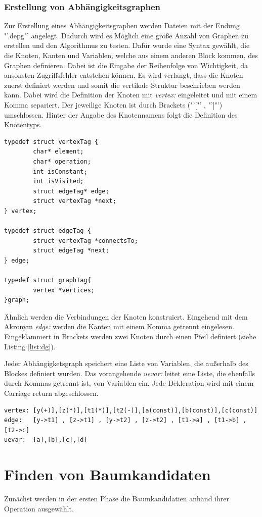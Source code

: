 \subsubsection*{Erstellung von Abhängigkeitsgraphen}
Zur Erstellung eines Abhängigkeitsgraphen werden Dateien mit der Endung "'.depg"' angelegt. Dadurch wird es Möglich eine große Anzahl von Graphen zu erstellen und den Algorithmus zu testen. Dafür wurde eine Syntax gewählt, die die Knoten, Kanten und Variablen, welche aus einem anderen Block kommen, des Graphen definieren. Dabei ist die Eingabe der Reihenfolge von Wichtigkeit, da ansonsten Zugriffsfehler entstehen können. 
Es wird verlangt, dass die Knoten zuerst definiert werden und somit die vertikale Struktur beschrieben werden kann. Dabei wird die Definition der Knoten mit \textit{vertex:} eingeleitet und mit einem Komma separiert.
Der jeweilige Knoten ist durch Brackets ("'["' , "']"') umschlossen. Hinter der Angabe des Knotennamens folgt die Definition des Knotentyps. 
\newpage
\begin{lstlisting}[caption=Struktur eines Graphen., label=list:graph]
typedef struct vertexTag {
		char* element;    
		char* operation;  
		int isConstant;
		int isVisited;
		struct edgeTag* edge;
		struct vertexTag *next;
} vertex;

typedef struct edgeTag {
		struct vertexTag *connectsTo;
		struct edgeTag *next;
} edge;

typedef struct graphTag{
		vertex *vertices;	
}graph;
\end{lstlisting}

Ähnlich werden die Verbindungen der Knoten konstruiert. Eingehend mit dem Akronym \textit{edge:} werden die Kanten mit einem Komma getrennt eingelesen. Eingeklammert in Brackets werden zwei Knoten durch einen Pfeil definiert (siehe Listing \ref{list:dg}). 

Jeder Abhängigketsgraph speichert eine Liste von Variablen, die außerhalb des Blockes definiert wurden. Das 
vorangehende \textit{uevar:} leitet eine Liste, die ebenfalls durch Kommas getrennt ist, von Variablen ein. Jede Dekleration wird mit einem Carriage return abgeschlossen.
\begin{lstlisting}[caption=Konstruktion eines Abhängigkeitsgraphen., label=list:dg]
vertex: [y(+)],[z(*)],[t1(*)],[t2(-)],[a(const)],[b(const)],[c(const)]
edge:   [y->t1] , [z->t1] , [y->t2] , [z->t2] , [t1->a] , [t1->b] ,[t2->c] 
uevar:  [a],[b],[c],[d]
\end{lstlisting}


\section{Finden von Baumkandidaten}
Zunächst werden in der ersten Phase die Baumkandidatien anhand ihrer Operation ausgewählt.


